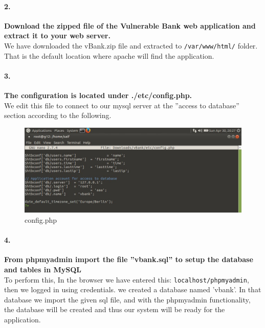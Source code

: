 \documentclass[12pt]{report}
\begin{document}
	\paragraph*{2.} {\bf Download the zipped file of the Vulnerable Bank web application and extract it to your web server. }\\
	We have downloaded the vBank.zip file and extracted to {\tt /var/www/html/} folder. That is the default location where apache will find the application.\\
	
	\paragraph*{3.} {\bf The configuration is located under ./etc/config.php.}\\
	We edit this file to connect to our mysql server at the ''access to database'' section according to the following.\\
	\begin{figure}[H]
		\includegraphics[width=0.75\textheight]{images/config.jpg}
		\caption{config.php}
		\label{fig1:config.php}
	\end{figure}
	
	\paragraph*{4.}	{\bf From phpmyadmin import the file ''vbank.sql'' to setup the database and tables in MySQL}\\
	
	To perform this, In the browser we have entered this: {\tt localhost/phpmyadmin}, then we logged in using credentials. we created a database named 'vbank'. In that database we import the given sql file, and with the phpmyadmin functionality, the database will be created and thus our system will be ready for the application.
	
\end{document}
